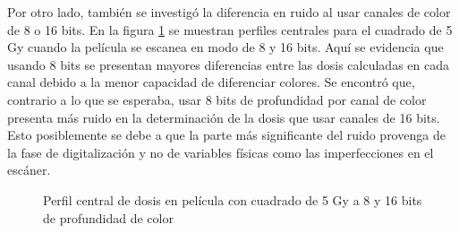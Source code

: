Por otro lado, también se investigó la diferencia en ruido al usar canales de color de 8 o 16 bits. En la figura  \ref{fig:8o16} se muestran perfiles centrales para el cuadrado de 5 Gy cuando la película se escanea en modo de 8 y 16 bits. Aquí se evidencia que usando 8 bits se presentan mayores diferencias entre las dosis calculadas en cada canal debido a la menor capacidad de diferenciar colores. Se encontró que, contrario a lo que se esperaba, usar 8 bits de profundidad por canal de color presenta más ruido en la determinación de la dosis que usar canales de 16 bits. Esto posiblemente se debe a que la parte más significante del ruido provenga de la fase de digitalización y no de variables físicas como las imperfecciones en el escáner. \\
\begin{figure}[H]
	\centering
	\hfill
	\caption{Perfil central de dosis en película con cuadrado de 5 Gy a 8 y 16 bits de profundidad de color}
	\label{fig:8o16}
\end{figure}

